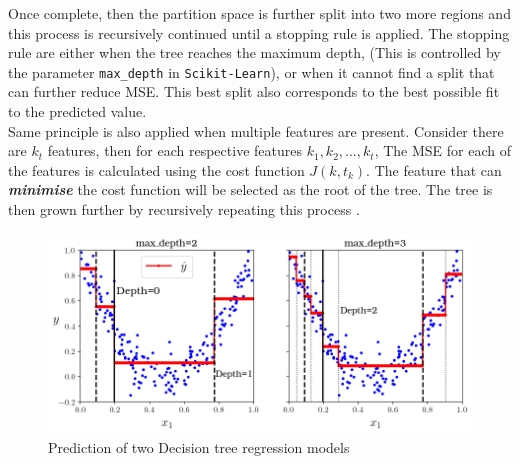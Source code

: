 Once complete, then the partition space is further split into two more regions and this process is recursively continued until a stopping rule is applied. The stopping rule are either when the tree reaches the maximum depth, (This is controlled by the parameter {\tt max\_depth} in {\tt Scikit-Learn}), or when it cannot find a split that can further reduce MSE. This best split also corresponds to the best possible fit to the predicted value.\\ 

Same principle is also applied when multiple features are present. Consider there are $k_t$ features, then for each respective features $k_1,k_2,\dots,k_t$, The MSE for each of the features is calculated using the cost function $J(k,t_k)$. The feature that can \emph{\textbf{minimise}} the cost function will be selected as the root of the tree. The tree is then grown further by recursively repeating this process \cite{Hastie.2009,Geron.2019}.\\

\begin{figure}[h]
    \centering
    \includegraphics[width=.9\textwidth]{02_figures/fig6_5_partspace_geron09.png}
    \caption{Prediction of two Decision tree regression models \cite{Geron.2019}}
    \label{fig:geron6_5}
\end{figure}

